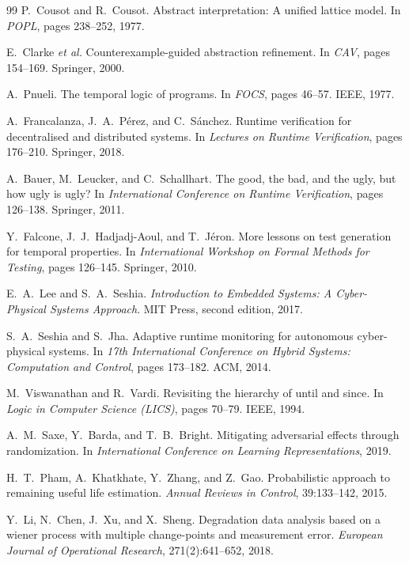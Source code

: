 \documentclass{llncs}
\begin{document}
\begin{thebibliography}{99}
P.~Cousot and R.~Cousot.
Abstract interpretation: A unified lattice model.
In \textit{POPL}, pages 238--252, 1977.

E.~Clarke \textit{et al.}
Counterexample-guided abstraction refinement.
In \textit{CAV}, pages 154--169. Springer, 2000.

A.~Pnueli.
The temporal logic of programs.
In \textit{FOCS}, pages 46--57. IEEE, 1977.

A.~Francalanza, J.~A.~P{\'e}rez, and C.~S{\'a}nchez.
Runtime verification for decentralised and distributed systems.
In \textit{Lectures on Runtime Verification}, pages 176--210. Springer, 2018.

A.~Bauer, M.~Leucker, and C.~Schallhart.
The good, the bad, and the ugly, but how ugly is ugly?
In \textit{International Conference on Runtime Verification}, pages 126--138. Springer, 2011.

Y.~Falcone, J.~J.~Hadjadj-Aoul, and T.~Jéron.
More lessons on test generation for temporal properties.
In \textit{International Workshop on Formal Methods for Testing},
pages 126--145. Springer, 2010.

E.~A.~Lee and S.~A.~Seshia.
\textit{Introduction to Embedded Systems: A Cyber-Physical Systems Approach}.
MIT Press, second edition, 2017.

S.~A.~Seshia and S.~Jha.
Adaptive runtime monitoring for autonomous cyber-physical systems.
In \textit{17th International Conference on Hybrid Systems: Computation and
Control}, pages 173--182. ACM, 2014.

M.~Viswanathan and R.~Vardi.
Revisiting the hierarchy of until and since.
In \textit{Logic in Computer Science (LICS)}, pages 70--79. IEEE, 1994.

A.~M.~Saxe, Y.~Barda, and T.~B.~Bright.
Mitigating adversarial effects through randomization.
In \textit{International Conference on Learning Representations}, 2019.

H.~T.~Pham, A.~Khatkhate, Y.~Zhang, and Z.~Gao.
Probabilistic approach to remaining useful life estimation.
\textit{Annual Reviews in Control}, 39:133--142, 2015.

Y.~Li, N.~Chen, J.~Xu, and X.~Sheng.
Degradation data analysis based on a wiener process with
multiple change-points and measurement error.
\textit{European Journal of Operational Research}, 271(2):641--652, 2018.


\end{thebibliography}
\end{document}
